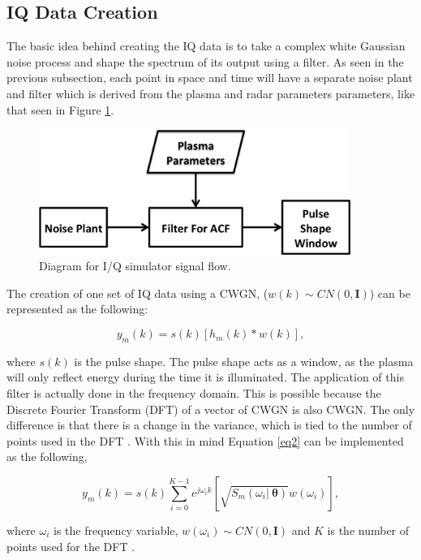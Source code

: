 \documentclass[draft,ras]{agutex}
\begin{document}
\begin{article}
\subsection{ IQ Data Creation}
The basic idea behind creating the IQ data is to take a complex white Gaussian noise process and shape the spectrum of its output using a filter. As seen in the previous subsection, each point in space and time will have a separate noise plant and filter which is derived from the plasma and radar parameters parameters, like that seen in Figure \ref{fig:IQdiagram}. 

\begin{figure}[h!]
\centering
\includegraphics[width=4in]{diagrampart}
\caption{Diagram for I/Q simulator signal flow.}
\label{fig:IQdiagram}
\end{figure}

The creation of one set of IQ data using a CWGN, ($w(k)\sim CN(0,\mathbf{I})$) can be represented as the following:   

\begin{equation}
\label{eq2}
y_m (k)= s(k)\left[h_m(k)*w(k)\right],
\end{equation}
 
\noindent where $s(k)$ is the pulse shape. The pulse shape acts as a window, as the plasma will only reflect energy during the time it is illuminated. The application of this filter is actually done in the frequency domain. This is possible because the Discrete Fourier Transform (DFT) of a vector of CWGN is also CWGN. The only difference is that there is a change in the variance, which is tied to the number of points used in the DFT \citep{kayvol1}. With this in mind Equation \ref{eq2} can be implemented as the following,

\begin{equation}
\label{eq:fftfilt}
y_m (k)= s(k)\displaystyle \sum_{i=0}^{K-1}e^{j\omega_ik}\left[ \sqrt{S_m(\omega_i | \: \bm{\theta})}w(\omega_i)\right],
\end{equation}

\noindent where $\omega_i$ is the frequency variable, $w(\omega_i) \sim CN(0,\mathbf{I})$ and $K$ is the number of points used for the DFT \citep{michellnoisesim1981}.


\end{article}
\end{document}
